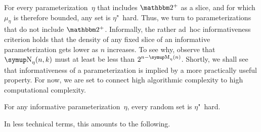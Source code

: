 For every parameterization~$\eta$ that includes $\binary^+$ as a slice, and for which $\mu_\eta$ is therefore bounded, any set is $\eta$"~hard.
Thus, we turn to parameterizations that do not include $\binary^+$.
Informally, the rather ad~hoc informativeness criterion holds that the density of any fixed slice of an informative parameterization gets lower as $n$ increases.
To see why, observe that $\upN_\eta(n, k)$ must at least be less than $2^{n - \upM_\eta(n)}$.
Shortly, we shall see that informativeness of a parameterization is implied by a more practically useful property.
For now, we are set to connect high algorithmic complexity to high computational complexity.
\begin{theorem}
\label{thm:randomhard}%
  For any informative parameterization~$\eta$, every random set is $\eta$"~hard.
\end{theorem}
In less technical terms, this amounts to the following.
